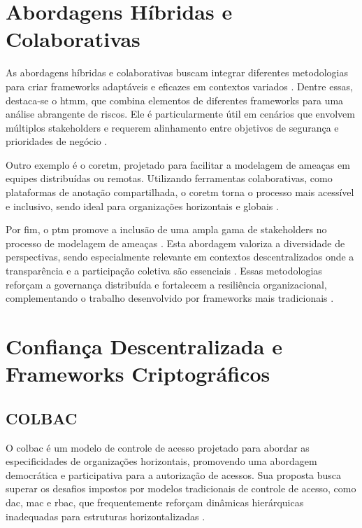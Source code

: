 \section{Abordagens Híbridas e Colaborativas}
\label{sec:hybrid_collaborative_approaches}

As abordagens híbridas e colaborativas buscam integrar diferentes
metodologias para criar frameworks adaptáveis e eficazes em contextos
variados \cite{AHybridThreatModelingMethod, CoReTM}.
Dentre essas, destaca-se o \gls{htmm}, que combina elementos
de diferentes frameworks para uma análise abrangente de riscos.
Ele é particularmente útil em cenários que envolvem múltiplos
stakeholders e requerem alinhamento entre objetivos de segurança
e prioridades de negócio \cite{AHybridThreatModelingMethod}.

Outro exemplo é o \gls{coretm},
projetado para facilitar a modelagem de ameaças em equipes
distribuídas ou remotas. Utilizando ferramentas colaborativas, como
plataformas de anotação compartilhada, o \gls{coretm} torna o processo mais
acessível e inclusivo, sendo ideal para organizações horizontais e
globais \cite{CoReTM}.

Por fim, o \gls{ptm} promove a inclusão de uma ampla gama de stakeholders
no processo de modelagem de ameaças \cite{ParticipatoryThreatModelling}. 
Esta abordagem valoriza a diversidade de perspectivas, sendo
especialmente relevante em contextos descentralizados onde a
transparência e a participação coletiva são essenciais
\cite{ParticipatoryThreatModelling}. Essas metodologias reforçam a
governança distribuída e fortalecem a resiliência organizacional,
complementando o trabalho desenvolvido por frameworks mais
tradicionais \cite{Colbac}.



\section{Confiança Descentralizada e Frameworks Criptográficos}
\label{sec:decentralized_cryptographic}

\subsection{COLBAC}
\label{subsec:colbac}

O \gls{colbac} é um modelo de controle de
acesso projetado para abordar as especificidades de organizações
horizontais, promovendo uma abordagem democrática e participativa para
a autorização de acessos. Sua proposta busca superar os desafios
impostos por modelos tradicionais de controle de acesso, como
\gls{dac}, \gls{mac} e \gls{rbac}, que frequentemente reforçam dinâmicas
hierárquicas inadequadas para estruturas horizontalizadas \cite{Colbac}.

